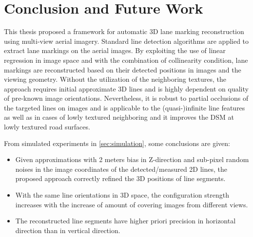 
\chapter{Conclusion and Future Work}
\label{chap:conclusion}

This thesis proposed a framework for automatic 3D lane marking reconstruction using multi-view aerial imagery. Standard line detection algorithms are applied to extract lane markings on the aerial images. By exploiting the use of linear regression in image space and with the combination of collinearity condition, lane markings are reconstructed based on their detected positions in images and the viewing geometry. Without the utilization of the neighboring textures, the approach requires initial approximate 3D lines and is highly dependent on quality of pre-known image orientations. Nevertheless, it is robust to partial occlusions of the targeted lines on images and is applicable to the (quasi-)infinite line features as well as in cases of lowly textured neighboring and it improves the DSM at lowly textured road surfaces. 


From simulated experiments in \cref{sec:simulation}, some conclusions are given:
\begin{itemize}
	\item Given approximations with 2 meters bias in Z-direction and sub-pixel random noises in the image coordinates of the detected/measured 2D lines, the proposed approach correctly refined the 3D positions of line segments.
	
	\item With the same line orientations in 3D space, the configuration strength increases with the increase of amount of covering images from different views.
	
	\item The reconstructed line segments have higher priori precision in horizontal direction than in vertical direction.
\end{itemize}



